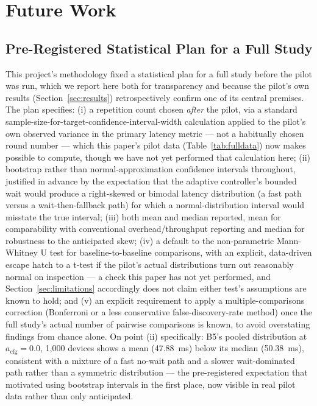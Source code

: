 \documentclass[journal]{IEEEtran}
\newcommand{\acfg}{\ensuremath{a_{\text{cfg}}}}
\begin{document}
\section{Future Work}
\label{sec:futurework}

\subsection{Pre-Registered Statistical Plan for a Full Study}

This project's methodology fixed a statistical plan for a full study before the pilot was run, which we report here both for transparency and because the pilot's own results (Section~\ref{sec:results}) retrospectively confirm one of its central premises. The plan specifies: (i) a repetition count chosen \emph{after} the pilot, via a standard sample-size-for-target-confidence-interval-width calculation applied to the pilot's own observed variance in the primary latency metric --- not a habitually chosen round number --- which this paper's pilot data (Table~\ref{tab:fulldata}) now makes possible to compute, though we have not yet performed that calculation here; (ii) bootstrap rather than normal-approximation confidence intervals throughout, justified in advance by the expectation that the adaptive controller's bounded wait would produce a right-skewed or bimodal latency distribution (a fast path versus a wait-then-fallback path) for which a normal-distribution interval would misstate the true interval; (iii) both mean and median reported, mean for comparability with conventional overhead/throughput reporting and median for robustness to the anticipated skew; (iv) a default to the non-parametric Mann-Whitney U test for baseline-to-baseline comparisons, with an explicit, data-driven escape hatch to a t-test if the pilot's actual distributions turn out reasonably normal on inspection --- a check this paper has not yet performed, and Section~\ref{sec:limitations} accordingly does not claim either test's assumptions are known to hold; and (v) an explicit requirement to apply a multiple-comparisons correction (Bonferroni or a less conservative false-discovery-rate method) once the full study's actual number of pairwise comparisons is known, to avoid overstating findings from chance alone. On point (ii) specifically: B5's pooled distribution at $\acfg=0.0$, 1{,}000 devices shows a mean (\qty{47.88}{ms}) below its median (\qty{50.38}{ms}), consistent with a mixture of a fast no-wait path and a slower wait-dominated path rather than a symmetric distribution --- the pre-registered expectation that motivated using bootstrap intervals in the first place, now visible in real pilot data rather than only anticipated.
\end{document}
